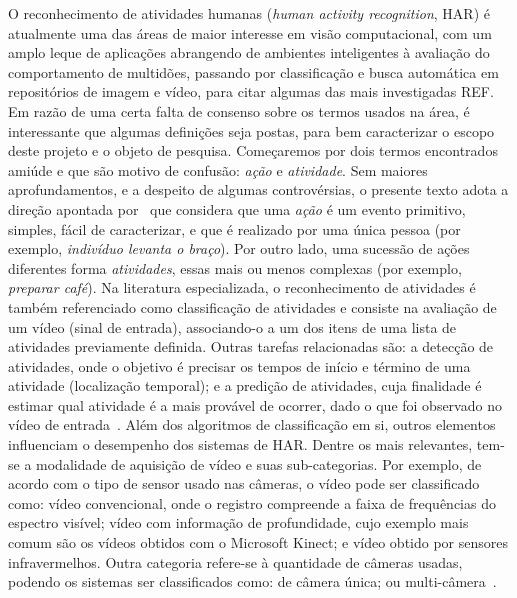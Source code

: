 \nocite{jegham-2020, hussain-2020,yao-2019,kongr-2018,herath-2017}
O reconhecimento de atividades humanas (\emph{human activity recognition}, HAR) é atualmente uma das áreas de maior interesse em visão computacional, com um amplo leque de aplicações abrangendo de ambientes inteligentes à avaliação do comportamento de multidões, passando por classificação e busca automática em repositórios de imagem e vídeo, para citar algumas das mais investigadas REF.
%
Em razão de uma certa falta de consenso sobre os termos usados na área, é interessante que algumas definições seja postas, para bem caracterizar o escopo deste projeto e o objeto de pesquisa. 
Começaremos por dois termos encontrados amiúde e que são motivo de confusão: \emph{ação} e \emph{atividade}. Sem maiores aprofundamentos, e a despeito de algumas controvérsias, o presente texto adota a direção apontada por~\textcite{herath-2017} que considera que uma \emph{ação} é um evento primitivo, simples, fácil de caracterizar, e que é realizado por uma única pessoa (por exemplo, \emph{indivíduo levanta o braço}). Por outro lado, uma sucessão de ações diferentes forma \emph{atividades}, essas mais ou menos complexas (por exemplo, \emph{preparar café}).
%
Na literatura especializada, o reconhecimento de atividades é também referenciado como classificação de atividades e consiste na avaliação de um vídeo (sinal de entrada), associando-o a um dos itens de uma lista de atividades previamente definida. Outras tarefas relacionadas são: a detecção de atividades, onde o objetivo é precisar os tempos de início e término de uma atividade (localização temporal); e a predição de atividades, cuja finalidade é estimar qual atividade é a mais provável de  ocorrer, dado o que foi observado no vídeo de entrada~\parencite{yao-2019}.%
%
Além dos algoritmos de classificação em si, outros elementos influenciam o desempenho dos sistemas de HAR. Dentre os mais relevantes, tem-se a modalidade de aquisição de vídeo e suas sub-categorias. Por exemplo, de acordo com o tipo de sensor usado nas câmeras, o vídeo pode ser classificado como: vídeo convencional, onde o registro compreende a faixa de frequências do espectro visível; vídeo com informação de profundidade, cujo exemplo mais comum são os vídeos obtidos com o Microsoft Kinect; e vídeo obtido por sensores infravermelhos. Outra categoria refere-se à quantidade de câmeras usadas, podendo os sistemas ser classificados como: de câmera única; ou multi-câmera~\parencite{yao-2019}.
